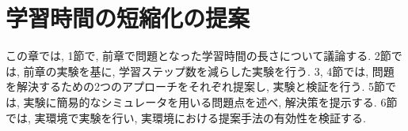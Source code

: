 \chapter{学習時間の短縮化の提案}
\label{chap:experiments}
この章では, 1節で, 前章で問題となった学習時間の長さについて議論する. 2節では, 前章の実験を基に, 学習ステップ数を減らした実験を行う. 3, 4節では, 問題を解決するための2つのアプローチをそれぞれ提案し, 実験と検証を行う. 5節では, 実験に簡易的なシミュレータを用いる問題点を述べ, 解決策を提示する. 6節では, 実環境で実験を行い, 実環境における提案手法の有効性を検証する.  
%
%
%
% 



%
